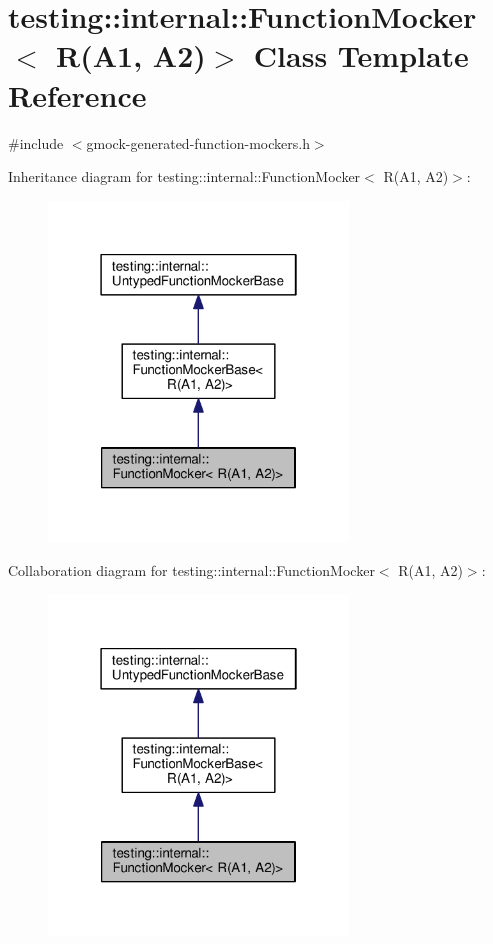 \hypertarget{classtesting_1_1internal_1_1FunctionMocker_3_01R_07A1_00_01A2_08_4}{}\section{testing\+:\+:internal\+:\+:Function\+Mocker$<$ R(A1, A2)$>$ Class Template Reference}
\label{classtesting_1_1internal_1_1FunctionMocker_3_01R_07A1_00_01A2_08_4}


{\ttfamily \#include $<$gmock-\/generated-\/function-\/mockers.\+h$>$}



Inheritance diagram for testing\+:\+:internal\+:\+:Function\+Mocker$<$ R(A1, A2)$>$\+:\nopagebreak
\begin{figure}[H]
\begin{center}
\leavevmode
\includegraphics[width=226pt]{classtesting_1_1internal_1_1FunctionMocker_3_01R_07A1_00_01A2_08_4__inherit__graph}
\end{center}
\end{figure}


Collaboration diagram for testing\+:\+:internal\+:\+:Function\+Mocker$<$ R(A1, A2)$>$\+:\nopagebreak
\begin{figure}[H]
\begin{center}
\leavevmode
\includegraphics[width=226pt]{classtesting_1_1internal_1_1FunctionMocker_3_01R_07A1_00_01A2_08_4__coll__graph}
\end{center}
\end{figure}
